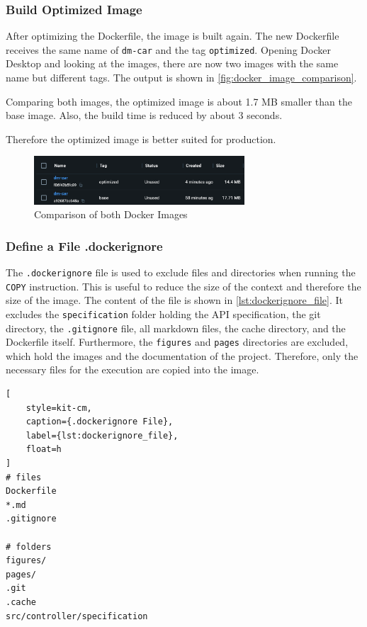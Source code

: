 \subsubsection*{Build Optimized Image}
After optimizing the Dockerfile, the image is built again.
The new Dockerfile receives the same name of \texttt{dm-car} and the tag \texttt{optimized}.
Opening Docker Desktop and looking at the images, there are now two images with the same name but different tags.
The output is shown in \autoref{fig:docker_image_comparison}.

Comparing both images, the optimized image is about 1.7 MB smaller than the base image.
Also, the build time is reduced by about 3 seconds.

Therefore the optimized image is better suited for production.

\begin{figure}
    \centering
    \includegraphics[width=0.7\textwidth]{figures/microservices/dmCar/ms_dmCar_optimizedComparison.png}
    \caption{Comparison of both Docker Images}
    \label{fig:docker_image_comparison}
\end{figure}

\subsubsection*{Define a File .dockerignore}
The \texttt{.dockerignore} file is used to exclude files and directories when running the \texttt{COPY} instruction.
This is useful to reduce the size of the context and therefore the size of the image.
The content of the file is shown in \autoref*{lst:dockerignore_file}.
It excludes the \texttt{specification} folder holding the API specification, the git directory, the \texttt{.gitignore} file, all markdown files, the cache directory, and the Dockerfile itself.
Furthermore, the \texttt{figures} and \texttt{pages} directories are excluded, which hold the images and the documentation of the project.
Therefore, only the necessary files for the execution are copied into the image.

\begin{lstlisting}[
    style=kit-cm,
    caption={.dockerignore File},
    label={lst:dockerignore_file},
    float=h
]
# files
Dockerfile
*.md
.gitignore

# folders
figures/
pages/
.git
.cache
src/controller/specification
\end{lstlisting}

